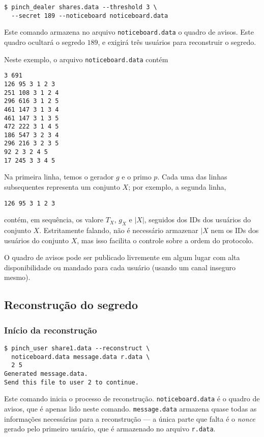 \documentclass[10pt,twocolumn]{article}
\begin{document}
\begin{verbatim}
$ pinch_dealer shares.data --threshold 3 \
  --secret 189 --noticeboard noticeboard.data
\end{verbatim}
Este comando armazena no arquivo \verb"noticeboard.data" o quadro de avisos.
Este quadro ocultará o segredo $189$,
e exigirá três usuários para reconstruir o segredo.

Neste exemplo, o arquivo \verb"noticeboard.data" contém
\begin{verbatim}
3 691
126 95 3 1 2 3
251 108 3 1 2 4
296 616 3 1 2 5
461 147 3 1 3 4
461 147 3 1 3 5
472 222 3 1 4 5
186 547 3 2 3 4
296 216 3 2 3 5
92 2 3 2 4 5
17 245 3 3 4 5
\end{verbatim}
Na primeira linha, temos o gerador $g$ e o primo $p$.
Cada uma das linhas subsequentes representa um conjunto $X$;
por exemplo, a segunda linha,
\begin{verbatim}
126 95 3 1 2 3
\end{verbatim}
contém, em sequência, os valore $T_X$, $g_X$ e $|X|$,
seguidos dos IDs dos usuários do conjunto $X$.
Estritamente falando,
não é necessário armazenar $|X$ nem os IDs dos usuários do conjunto $X$,
mas isso facilita o controle sobre a ordem do protocolo.

O quadro de avisos pode ser publicado livremente em algum lugar com alta disponibilidade
ou mandado para cada usuário (usando um canal inseguro mesmo).

\subsection{Reconstrução do segredo}

\subsubsection{Início da reconstrução}

\begin{verbatim}
$ pinch_user share1.data --reconstruct \
  noticeboard.data message.data r.data \
  2 5
Generated message.data.
Send this file to user 2 to continue.
\end{verbatim}
Este comando inicia o processo de reconstrução.
\verb"noticeboard.data" é o quadro de avisos,
que é apenas lido neste comando.
\verb"message.data" armazena quase todas as informações necessárias para a reconstrução
--- a única parte que falta é o \emph{nonce} gerado pelo primeiro usuário,
que é armazenado no arquivo \verb"r.data".
\end{document}
